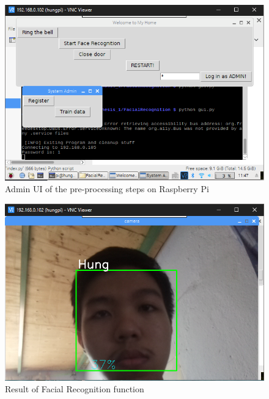 \begin{figure}[!htb]
    \begin{center}
    \includegraphics[scale=0.85]{images/rpiAdminUi.png}
    \caption{Admin UI of the pre-processing steps on Raspberry Pi}
    \label{fig:rpiAdminUi}
    \end{center}
\end{figure}
\begin{figure}[!htb]
    \begin{center}
    \includegraphics[scale=0.85]{images/rpiCap.png}
    \caption{Result of Facial Recognition function}
    \label{fig:rpiCap}
    \end{center}
\end{figure}